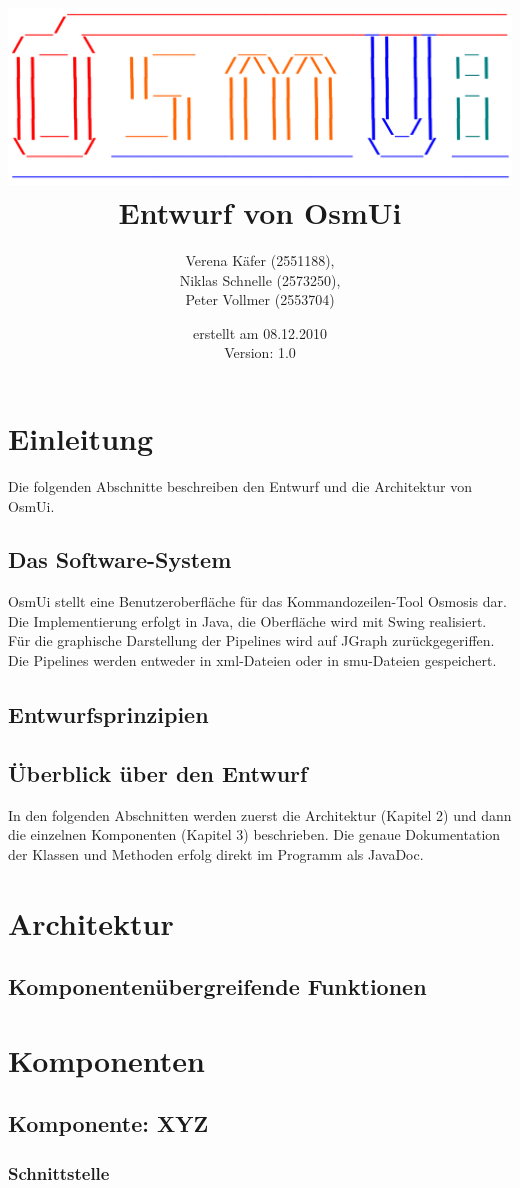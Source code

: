 \documentclass[a4paper,12pt]{scrartcl}
\author{
Verena Käfer (2551188),\\
Niklas Schnelle (2573250),\\
Peter Vollmer (2553704)}
\date{erstellt am 08.12.2010\\
Version: 1.0}
\title{\includegraphics[width=15cm]{../projektplan/Logo_Osmui.png} \\ 
Entwurf von OsmUi}
\begin{document}
\maketitle
\newpage
\tableofcontents
\newpage

\section{Einleitung}
Die folgenden Abschnitte beschreiben den Entwurf und die Architektur von OsmUi.
\subsection{Das Software-System}
OsmUi stellt eine Benutzeroberfläche für das Kommandozeilen-Tool Osmosis dar. Die Implementierung erfolgt in Java, die Oberfläche wird mit Swing realisiert. Für die graphische Darstellung der Pipelines wird auf JGraph zurückgegeriffen. Die Pipelines werden entweder in xml-Dateien oder in smu-Dateien gespeichert.
\subsection{Entwurfsprinzipien}

\subsection{Überblick über den Entwurf}
In den folgenden Abschnitten werden zuerst die Architektur (Kapitel 2) und dann die einzelnen Komponenten (Kapitel 3) beschrieben. Die genaue Dokumentation der Klassen und Methoden erfolg direkt im Programm als JavaDoc.

\section{Architektur}
\subsection{Komponentenübergreifende Funktionen}

\section{Komponenten}
\subsection{Komponente: XYZ}
\subsubsection{Schnittstelle}
\end{document}
